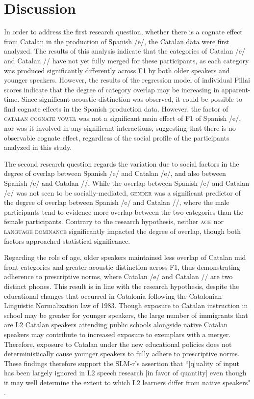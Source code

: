\documentclass[output=paper,colorlinks,citecolor=brown,draftmode]{langscibook}
\begin{document}
\section{Discussion}
In order to address the first research question, whether there is a cognate effect from Catalan in the production of Spanish /e/, the Catalan data were first analyzed. The results of this analysis indicate that the categories of Catalan /e/ and Catalan /\textepsilon/ have not yet fully merged for these participants, as each category was produced significantly differently across F1 by both older speakers and younger speakers. However, the results of the regression model of individual Pillai scores indicate that the degree of category overlap may be increasing in apparent-time. Since significant acoustic distinction was observed, it could be possible to find cognate effects in the Spanish production data. However, the factor of \textsc{catalan cognate vowel} was not a significant main effect of F1 of Spanish /e/, nor was it involved in any significant interactions, suggesting that there is no observable cognate effect, regardless of the social profile of the participants analyzed in this study.

The second research question regards the variation due to social factors in the degree of overlap between Spanish /e/ and Catalan /e/, and also between Spanish /e/ and Catalan /\textepsilon/. While the overlap between Spanish /e/ and Catalan /e/ was not seen to be socially-mediated, \textsc{gender} was a significant predictor of the degree of overlap between Spanish /e/ and Catalan /\textepsilon/, where the male participants tend to evidence more overlap between the two categories than the female participants. Contrary to the research hypothesis, neither \textsc{age} nor \textsc{language dominance} significantly impacted the degree of overlap, though both factors approached statistical significance.

Regarding the role of age, older speakers maintained less overlap of Catalan mid front categories and greater acoustic distinction across F1, thus demonstrating adherence to prescriptive norms, where Catalan /e/ and Catalan /\textepsilon/ are two distinct phones. This result is in line with the research hypothesis, despite the educational changes that occurred in Catalonia following the Catalonian Linguistic Normalization law of 1983. Though exposure to Catalan instruction in school may be greater for younger speakers, the large number of immigrants that are L2 Catalan speakers attending public schools alongside native Catalan speakers may contribute to increased exposure to exemplars with a merger. Therefore, exposure to Catalan under the new educational policies does not deterministically cause younger speakers to fully adhere to prescriptive norms. These findings therefore support the SLM-r's assertion that ``[q]uality of input has been largely ignored in L2 speech research [in favor of quantity] even though it may well determine the extent to which L2 learners differ from native speakers" \citep[][32]{flege2021revised}.
\end{document}
